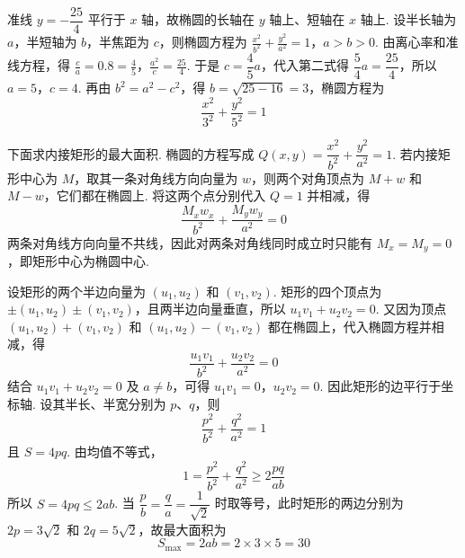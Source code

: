 \begin{solution}
准线 \(y=-\dfrac{25}{4}\) 平行于 \(x\) 轴，故椭圆的长轴在 \(y\) 轴上、短轴在 \(x\) 轴上. 设半长轴为 \(a\)，半短轴为 \(b\)，半焦距为 \(c\)，则椭圆方程为
\(\frac{x^2}{b^2}+\frac{y^2}{a^2}=1\)，\(a>b>0\).
由离心率和准线方程，得
\(\frac{c}{a}=0.8=\frac45\)，\(\frac{a^2}{c}=\frac{25}{4}\).
于是 \(c=\dfrac45a\)，代入第二式得 \(\dfrac54a=\dfrac{25}{4}\)，所以 \(a=5\)，\(c=4\). 再由 \(b^2=a^2-c^2\)，得 \(b=\sqrt{25-16}=3\)，椭圆方程为
\[
\frac{x^2}{3^2}+\frac{y^2}{5^2}=1
\]

下面求内接矩形的最大面积. 椭圆的方程写成 \(Q\left(x,y\right)=\dfrac{x^2}{b^2}+\dfrac{y^2}{a^2}=1\). 若内接矩形中心为 \(M\)，取其一条对角线方向向量为 \(w\)，则两个对角顶点为 \(M+w\) 和 \(M-w\)，它们都在椭圆上. 将这两个点分别代入 \(Q=1\) 并相减，得
\[
\frac{M_xw_x}{b^2}+\frac{M_yw_y}{a^2}=0
\]
两条对角线方向向量不共线，因此对两条对角线同时成立时只能有 \(M_x=M_y=0\)，即矩形中心为椭圆中心.

设矩形的两个半边向量为 \(\left(u_1,u_2\right)\) 和 \(\left(v_1,v_2\right)\). 矩形的四个顶点为 \(\pm\left(u_1,u_2\right)\pm\left(v_1,v_2\right)\)，且两半边向量垂直，所以 \(u_1v_1+u_2v_2=0\). 又因为顶点 \(\left(u_1,u_2\right)+\left(v_1,v_2\right)\) 和 \(\left(u_1,u_2\right)-\left(v_1,v_2\right)\) 都在椭圆上，代入椭圆方程并相减，得
\[
\frac{u_1v_1}{b^2}+\frac{u_2v_2}{a^2}=0
\]
结合 \(u_1v_1+u_2v_2=0\) 及 \(a\neq b\)，可得 \(u_1v_1=0\)，\(u_2v_2=0\). 因此矩形的边平行于坐标轴. 设其半长、半宽分别为 \(p\)、\(q\)，则
\[
\frac{p^2}{b^2}+\frac{q^2}{a^2}=1
\]
且 \(S=4pq\).
由均值不等式，
\[
1=\frac{p^2}{b^2}+\frac{q^2}{a^2}\geq2\frac{pq}{ab}
\]
所以 \(S=4pq\leq2ab\). 当 \(\dfrac{p}{b}=\dfrac{q}{a}=\dfrac1{\sqrt2}\) 时取等号，此时矩形的两边分别为 \(2p=3\sqrt2\) 和 \(2q=5\sqrt2\)，故最大面积为
\[
S_{\max}=2ab=2\times3\times5=30
\]
\end{solution}
